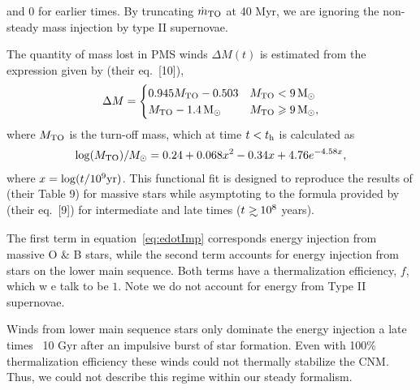 and 0 for earlier times. By truncating $\dot{m}_{\rm TO}$ at 40 Myr, we
are ignoring the non-steady mass injection by type II supernovae.

The quantity of mass lost in PMS winds $\Delta M(t)$ is estimated from
the expression given by \citet{CiottiOstriker:2007a} (their eq.~[10]),
\begin{align}
\Delta M=
\begin{cases}
0.945 M_{\rm TO}-0.503 & M_{\rm TO} < 9 \,{\rm M_\odot}\\
 M_{\rm TO}-1.4 \,{\rm M_\odot} &  M_{\rm TO} \geqslant 9 \,{\rm M_\odot},
\end{cases}
\end{align}
where $M_{\rm TO}$ is the turn-off mass, which at time $t < t_{\rm h}$ is calculated as
\begin{align}
\log(M_{\rm TO})/M_{\odot} =0.24 + 0.068 x^2-0.34 x+4.76 e^{-4.58 x},
\end{align}
where $x=\log(t/10^9 {\rm yr})$.  This functional fit is designed
to reproduce the results of \citet{MaederMeynet:1987a} (their Table 9)
for massive stars while asymptoting to the formula provided by
\citet{CiottiOstriker:2007a} (their eq.~[9]) for intermediate and late
times ($t \gsim 10^8$ years).

The first term in equation~\eqref{eq:edotImp} corresponds energy
injection from massive O \& B stars, while the second term accounts
for energy injection from stars on the lower main sequence. Both terms
have a thermalization efficiency, $f$, which w e talk to be $1$. Note
we do not account for energy from Type II supernovae. 

Winds from lower main sequence stars only dominate the energy
injection a late times ~10 Gyr after an impulsive burst of star
formation. Even with 100\% thermalization efficiency these winds could
not thermally stabilize the CNM. Thus, we could not describe this
regime within our steady formalism.

